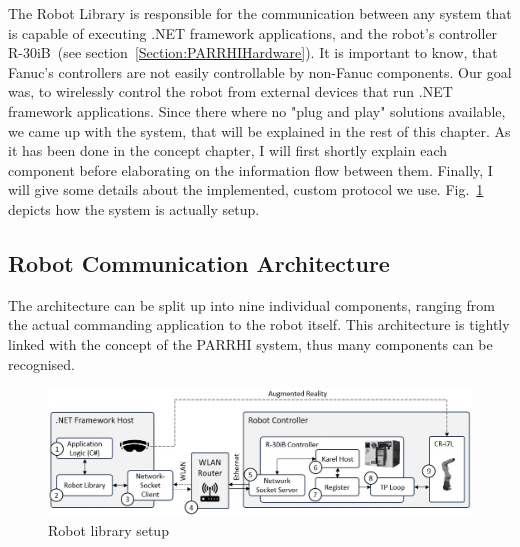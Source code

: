 The Robot Library is responsible for the communication between any system that is capable of executing .NET framework applications, and the robot's controller R-30iB~(see section~\ref{Section:PARRHIHardware}). It is important to know, that Fanuc's controllers are not easily controllable by non-Fanuc components. Our goal was, to wirelessly control the robot from external devices that run .NET framework applications. Since there where no "plug and play" solutions available, we came up with the system, that will be explained in the rest of this chapter. As it has been done in the concept chapter, I will first shortly explain each component before elaborating on the information flow between them. Finally, I will give some details about the implemented, custom protocol we use. Fig.~\ref{Fig:RobotArchitecture} depicts how the system is actually setup.

\subsection{Robot Communication Architecture}

The architecture can be split up into nine individual components, ranging from the actual commanding application to the robot itself. This architecture is tightly linked with the concept of the PARRHI system, thus many components can be recognised.

\begin{figure}
	\centering
	\includegraphics[width=1\textwidth]{Figures/RobotArchitecture.jpg}
	\caption{Robot library setup}
	\label{Fig:RobotArchitecture}
\end{figure}



